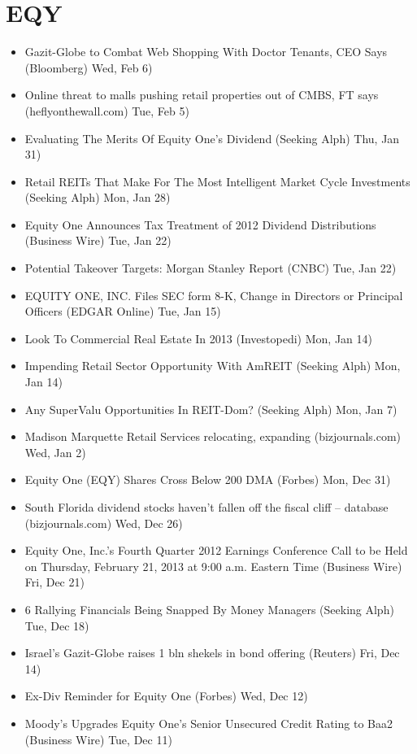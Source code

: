 \documentclass[11pt,asymmetric]{article}
\begin{document}
\section*{EQY}
\begin{itemize}
\item Gazit-Globe to Combat Web Shopping With Doctor Tenants, CEO Says (Bloomberg) Wed, Feb 6)
\item Online threat to malls pushing retail properties out of CMBS, FT says (heflyonthewall.com) Tue, Feb 5)
\item Evaluating The Merits Of Equity One's Dividend (Seeking Alph) Thu, Jan 31)
\item Retail REITs That Make For The Most Intelligent Market Cycle Investments (Seeking Alph) Mon, Jan 28)
\item Equity One Announces Tax Treatment of 2012 Dividend Distributions (Business Wire) Tue, Jan 22)
\item Potential Takeover Targets: Morgan Stanley Report (CNBC) Tue, Jan 22)
\item EQUITY ONE, INC. Files SEC form 8-K, Change in Directors or Principal Officers (EDGAR Online) Tue, Jan 15)
\item Look To Commercial Real Estate In 2013 (Investopedi) Mon, Jan 14)
\item Impending Retail Sector Opportunity With AmREIT (Seeking Alph) Mon, Jan 14)
\item Any SuperValu Opportunities In REIT-Dom? (Seeking Alph) Mon, Jan 7)
\item Madison Marquette Retail Services relocating, expanding (bizjournals.com) Wed, Jan 2)
\item Equity One (EQY) Shares Cross Below 200 DMA (Forbes) Mon, Dec 31)
\item South Florida dividend stocks haven't fallen off the fiscal cliff – database (bizjournals.com) Wed, Dec 26)
\item Equity One, Inc.’s Fourth Quarter 2012 Earnings Conference Call to be Held on Thursday, February 21, 2013 at 9:00 a.m. Eastern Time (Business Wire) Fri, Dec 21)
\item 6 Rallying Financials Being Snapped By Money Managers (Seeking Alph) Tue, Dec 18)
\item Israel's Gazit-Globe raises 1 bln shekels in bond offering (Reuters) Fri, Dec 14)
\item Ex-Div Reminder for Equity One (Forbes) Wed, Dec 12)
\item Moody’s Upgrades Equity One’s Senior Unsecured Credit Rating to Baa2 (Business Wire) Tue, Dec 11)

\end{itemize}
\end{document}
